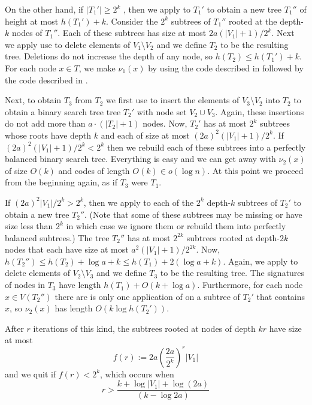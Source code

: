 \documentclass[kpfonts]{patmorin}
\begin{document}
On the other hand, if $|T_1'|\ge 2^k$ , then we apply  to $T_1'$ to obtain a new tree $T_1''$ of height at most $h(T_1')+k$.  Consider the $2^k$ subtrees of $T_1''$ rooted at the depth-$k$ nodes of $T_1''$.  Each of these subtrees has size at most $2a(|V_1|+1)/2^k$.  Next we apply use  to delete elements of $V_1\setminus V_2$ and we define $T_2$ to be the resulting tree.  Deletions do not increase the depth of any node, so $h(T_2)\le h(T_1')+k$.  For each node $x\in T$, we make $\nu_1(x)$ by using the code described in  followed by the code described in .

Next, to obtain $T_3$ from $T_2$ we first use  to insert the elements of $V_3\setminus V_2$ into $T_2$ to obtain a binary search tree tree $T_2'$ with node set $V_2\cup V_3$.   Again, these insertions do not add more than $a\cdot(|T_2|+1)$ nodes.  Now, $T_2'$ has at most $2^k$ subtrees whose roots have depth $k$ and each of size at most $(2a)^2(|V_1|+1)/2^k$.  If $(2a)^2(|V_1|+1)/2^k < 2^k$ then we rebuild each of these subtrees into a perfectly balanced binary search tree.  Everything is easy and we can get away with $\nu_2(x)$ of size $O(k)$ and codes of length $O(k)\in o(\log n)$.  At this point we proceed from the beginning again, as if $T_3$ were $T_1$.

If $(2a)^2|V_1|/2^k > 2^k$, then we apply  to each of the $2^k$ depth-$k$ subtrees of $T_2'$ to obtain a new tree $T_2''$.  (Note that some of these subtrees may be missing or have size less than $2^k$ in which case we ignore them or rebuild them into perfectly balanced subtrees.)  The tree $T_2''$ has at most $2^{2k}$ subtrees rooted at depth-$2k$ nodes that each have size at most $a^2(|V_1|+1)/2^{2k}$. Now, $h(T_2'')\le h(T_2)+\log a+k\le h(T_1)+2(\log a + k)$. Again, we apply  to delete elements of $V_2\setminus V_3$ and we define $T_3$ to be the resulting tree.  The signatures of nodes in $T_3$ have length $h(T_1)+O(k+\log a)$.  Furthermore, for each node $x\in V(T_2'')$ there are is only one application of  on a subtree of $T_2'$ that contains $x$, so $\nu_2(x)$ has length $O(k\log h(T_2'))$.

After $r$ iterations of this kind, the subtrees rooted at nodes of depth $kr$ have size at most
\[
     f(r) := 2a\left(\frac{2a}{2^k}\right)^r|V_1|
\]
and we quit if $f(r)<2^k$, which occurs when
\[
   r > \frac{k + \log |V_1| + \log(2a)}{(k-\log 2a)}
\]
\end{document}

